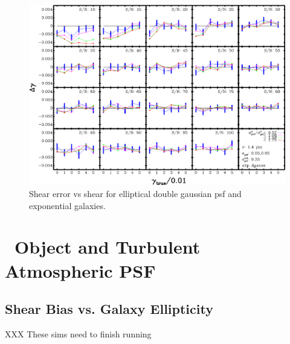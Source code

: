 \documentclass[12pt,preprint]{aastex}
\begin{document}
\begin{figure}[t] \centering
 \centering 
 \includegraphics[scale=1]{figures/set-edg01-yr-0.005-0.005-vs-shear.eps}

 \caption{Shear error vs shear for elliptical double gaussian psf and
 exponential galaxies.}
 \label{fig:diffvsshellippsf}

\end{figure}


\section{\devauc\ Object and Turbulent Atmospheric PSF}

\subsection{Shear Bias vs. Galaxy Ellipticity}


XXX These sims need to finish running


\end{document}
